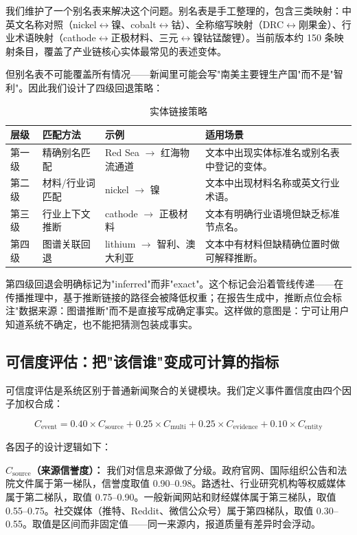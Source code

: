 \documentclass[12pt,a4paper]{ctexart}
\begin{document}
我们维护了一个别名表来解决这个问题。别名表是手工整理的，包含三类映射：中英文名称对照（nickel$\leftrightarrow$镍、cobalt$\leftrightarrow$钴）、全称缩写映射（DRC$\leftrightarrow$刚果金）、行业术语映射（cathode$\leftrightarrow$正极材料、三元$\leftrightarrow$镍钴锰酸锂）。当前版本约 150 条映射条目，覆盖了产业链核心实体最常见的表述变体。

但别名表不可能覆盖所有情况——新闻里可能会写"南美主要锂生产国"而不是"智利"。因此我们设计了四级回退策略：

\begin{table}[htbp]
\centering
\caption{实体链接策略}
\begin{tabularx}{\textwidth}{p{1.8cm}p{3.0cm}p{4.0cm}X}
\toprule
层级 & 匹配方法 & 示例 & 适用场景 \\
\midrule
第一级 & 精确别名匹配 & Red Sea $\to$ 红海物流通道 & 文本中出现实体标准名或别名表中登记的变体。 \\
第二级 & 材料/行业词匹配 & nickel $\to$ 镍 & 文本中出现材料名称或英文行业术语。 \\
第三级 & 行业上下文推断 & cathode $\to$ 正极材料 & 文本有明确行业语境但缺乏标准节点名。 \\
第四级 & 图谱关联回退 & lithium $\to$ 智利、澳大利亚 & 文本中有材料但缺精确位置时做可解释推断。 \\
\bottomrule
\end{tabularx}
\end{table}

第四级回退会明确标记为"inferred"而非"exact"。这个标记会沿着管线传递——在传播推理中，基于推断链接的路径会被降低权重；在报告生成中，推断点位会标注"数据来源：图谱推断"而不是直接写成确定事实。这样做的意图是：宁可让用户知道系统不确定，也不能把猜测包装成事实。

\subsection{可信度评估：把"该信谁"变成可计算的指标}

可信度评估是系统区别于普通新闻聚合的关键模块。我们定义事件置信度由四个因子加权合成：

\[
C_{\text{event}} = 0.40 \times C_{\text{source}} + 0.25 \times C_{\text{multi}} + 0.25 \times C_{\text{evidence}} + 0.10 \times C_{\text{entity}}
\]

各因子的设计逻辑如下：

\textbf{\(C_{\text{source}}\)（来源信誉度）：} 我们对信息来源做了分级。政府官网、国际组织公告和法院文件属于第一梯队，信誉度取值 0.90--0.98。路透社、行业研究机构等权威媒体属于第二梯队，取值 0.75--0.90。一般新闻网站和财经媒体属于第三梯队，取值 0.55--0.75。社交媒体（推特、Reddit、微信公众号）属于第四梯队，取值 0.30--0.55。取值是区间而非固定值——同一来源内，报道质量有差异时会浮动。
\end{document}
